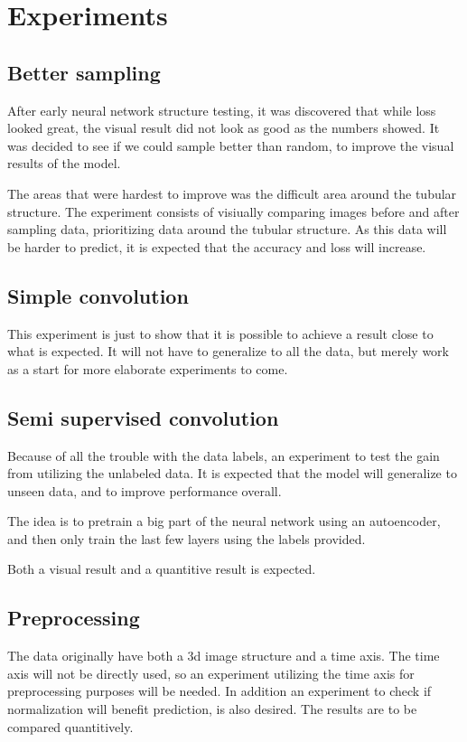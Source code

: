 \section{Experiments}\label{section:experiments}
\subsection{Better sampling} %
\label{sub:better_sampling}
After early neural network structure testing, it was discovered that while loss looked great, the visual result did not look as good as the numbers showed.
It was decided to see if we could sample better than random, to improve the visual results of the model.

The areas that were hardest to improve was the difficult area around the tubular structure.
The experiment consists of visiually comparing images before and after sampling data, prioritizing data around the tubular structure.
As this data will be harder to predict, it is expected that the accuracy and loss will increase.

\subsection{Simple convolution} %
\label{sub:simple_convolution}
This experiment is just to show that it is possible to achieve a result close to what is expected.
It will not have to generalize to all the data, but merely work as a start for more elaborate experiments to come.

\subsection{Semi supervised convolution} %
\label{sub:semi_supervised_convolution}

Because of all the trouble with the data labels, an experiment to test the gain from utilizing the unlabeled data.
It is expected that the model will generalize to unseen data, and to improve performance overall.

The idea is to pretrain a big part of the neural network using an autoencoder, and then only train the last few layers using the labels provided.

Both a visual result and a quantitive result is expected.

\subsection{Preprocessing} %
\label{sub:preprocessing}
The data originally have both a 3d image structure and a time axis.
The time axis will not be directly used, so an experiment utilizing the time axis for preprocessing purposes will be needed.
In addition an experiment to check if normalization will benefit prediction, is also desired.
The results are to be compared quantitively.
